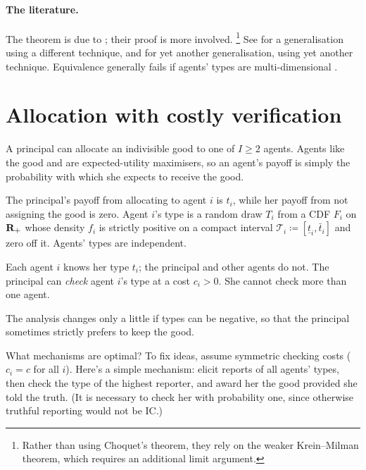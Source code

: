 \paragraph{The literature.}
The theorem is due to \textcite{ManelliVincent2010};
their proof is more involved.%
	\footnote{Rather than using Choquet's theorem, they rely on the weaker Krein--Milman theorem, which requires an additional limit argument.}
See \textcite{GershkovEtAl2013} for a generalisation using a different technique, and \textcite{KleinerMoldovanuStrack2021} for yet another generalisation, using yet another technique.
Equivalence generally fails if agents' types are multi-dimensional \parencite{JehielMoldovanuStacchetti1999}.



\section{Allocation with costly verification}
\label{sec:ch2:bdl14}

A principal can allocate an indivisible good to one of $I \geq 2$ agents.
Agents like the good and are expected-utility maximisers, so an agent's payoff is simply the probability with which she expects to receive the good.

The principal's payoff from allocating to agent $i$ is $t_i$,
while her payoff from not assigning the good is zero.
Agent $i$'s type is a random draw $T_i$ from a CDF $F_i$ on $\mathbf{R}_+$
whose density $f_i$ is strictly positive on a compact interval $\mathcal{T}_i \coloneqq \left[ \underline{t}_i, \bar{t}_i \right]$ and zero off it.
Agents' types are independent.

Each agent $i$ knows her type $t_i$; the principal and other agents do not.
The principal can \emph{check} agent $i$'s type at a cost $c_i>0$.
She cannot check more than one agent.

\begin{remark}
	\label{remark:bdl14_extensions}
	The analysis changes only a little if types can be negative, so that the principal sometimes strictly prefers to keep the good.
\end{remark}

What mechanisms are optimal?
To fix ideas, assume symmetric checking costs ($c_i = c$ for all $i$).
Here's a simple mechanism: elicit reports of all agents' types, then check the type of the highest reporter, and award her the good provided she told the truth. (It is necessary to check her with probability one, since otherwise truthful reporting would not be IC.)

